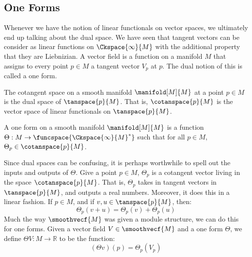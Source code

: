 \documentclass{article}                                                        %
\begin{document}
        \subsection{One Forms}
            Whenever we have the notion of linear functionals on vector spaces,
            we ultimately end up talking about the dual space. We have seen that
            tangent vectors can be consider as linear functions on
            $\Ckspace{\infty}{M}$ with the additional property that they are
            Liebnizian. A vector field is a function on a manifold $M$ that
            assigns to every point $p\in{M}$ a tangent vector $V_{p}$ at $p$.
            The dual notion of this is called a one form.
            \begin{definition}
                The cotangent space on a smooth manifold $\manifold[M]{M}$ at a
                point $p\in{M}$ is the dual space of $\tanspace{p}{M}$. That
                is, $\cotanspace{p}{M}$ is the vector space of linear
                functionals on $\tanspace{p}{M}$.
            \end{definition}
            \begin{definition}
                A one form on a smooth manifold $\manifold[M]{M}$ is a function
                $\Theta:M\rightarrow\funcspace{\Ckspace{\infty}{M}^{*}}$ such
                that for all $p\in{M}$, $\Theta_{p}\in\cotanspace{p}{M}$.
            \end{definition}
            Since dual spaces can be confusing, it is perhaps worthwhile to
            spell out the inputs and outputs of $\Theta$. Give a point
            $p\in{M}$, $\Theta_{p}$ is a cotangent vector living in the space
            $\cotanspace{p}{M}$. That is, $\Theta_{p}$ takes in tangent vectors
            in $\tanspace{p}{M}$, and outputs a real numbers. Moreover, it does
            this in a linear fashion. If $p\in{M}$, and if
            $v,u\in\tanspace{p}{M}$, then:
            \begin{equation}
                \Theta_{p}(v+u)=\Theta_{p}(v)+\Theta_{p}(u)
            \end{equation}
            Much the way $\smoothvecf{M}$ was given a module structure, we can
            do this for one forms. Given a vector field $V\in\smoothvecf{M}$ and
            a one form $\Theta$, we define $\Theta{V}:M\rightarrow\mathbb{R}$
            to be the function:
            \begin{equation}
                (\Theta{v})(p)=\Theta_{p}(V_{p})
            \end{equation}
\end{document}
